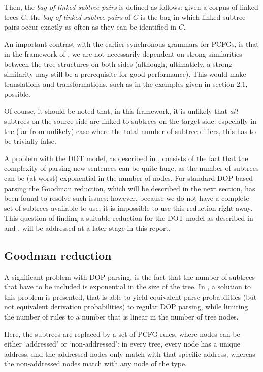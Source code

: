\documentclass[a4paper]{article}
\theoremstyle{definition}
\begin{document}
Then, the \emph{bag of linked subtree pairs} is defined as follows: given a corpus of linked trees $C$, the \emph{bag of linked subtree pairs} of $C$ is the bag in which linked subtree pairs occur exactly as often as they can be identified in $C$.

An important contrast with the earlier synchronous grammars for PCFGs, is that in the framework of \cite{Po}, we are not necessarily dependent on strong similarities between the tree structures on both sides (although, ultimatlely, a strong similarity may still be a prerequisite for good performance). This would make translations and transformations, such as in the examples given in section 2.1, possible.

Of course, it should be noted that, in this framework, it is unlikely that \emph{all} subtrees on the source side are linked to subtrees on the target side: especially in the (far from unlikely) case where the total number of subtree differs, this has to be trivially false.

A problem with the DOT model, as described in \cite{Po}, consists of the fact that the complexity of parsing new sentences can be quite huge, as the number of subtrees can be (at worst) exponential in the number of nodes. For standard DOP-based parsing the Goodman reduction, which will be described in the next section, has been found to resolve such issues: however, because we do not have a complete set of subtrees available to use, it is impossible to use this reduction right away. This question of finding a suitable reduction for the DOT model as described in \cite{Po} and \cite{Po2}, will be addressed at a later stage in this report.

\subsection{Goodman reduction}

A significant problem with DOP parsing, is the fact that the number of subtrees that have to be included is exponential in the size of the tree. In \cite{Go}, a solution to this problem is presented, that is able to yield equivalent parse probabilities (but not equivalent derivation probabilities) to regular DOP parsing, while limiting the number of rules to a number that is linear in the number of tree nodes.

Here, the subtrees are replaced by a set of PCFG-rules, where nodes can be either `addressed' or `non-addressed': in every tree, every node has a unique address, and the addressed nodes only match with that specific address, whereas the non-addressed nodes match with any node of the type.
\end{document}
